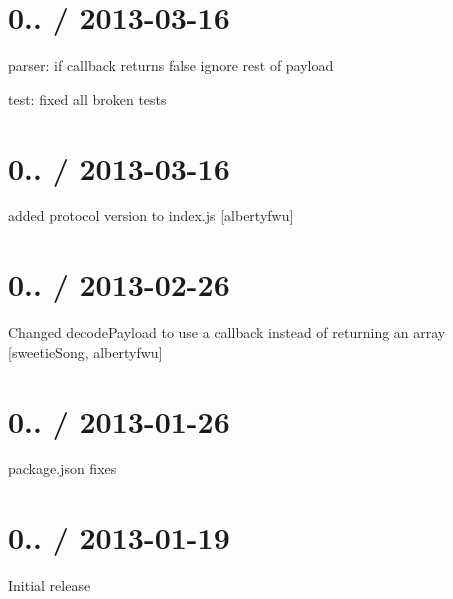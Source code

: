 \section*{0.. / 2013-\/03-\/16 }


\begin{DoxyItemize}
\item parser\+: if callback returns {\ttfamily false} ignore rest of payload
\item test\+: fixed all broken tests
\end{DoxyItemize}

\section*{0.. / 2013-\/03-\/16 }


\begin{DoxyItemize}
\item added protocol version to index.\+js \mbox{[}albertyfwu\mbox{]}
\end{DoxyItemize}

\section*{0.. / 2013-\/02-\/26 }


\begin{DoxyItemize}
\item Changed {\ttfamily decode\+Payload} to use a callback instead of returning an array \mbox{[}sweetie\+Song, albertyfwu\mbox{]}
\end{DoxyItemize}

\section*{0.. / 2013-\/01-\/26 }


\begin{DoxyItemize}
\item package.\+json fixes
\end{DoxyItemize}

\section*{0.. / 2013-\/01-\/19 }


\begin{DoxyItemize}
\item Initial release 
\end{DoxyItemize}
